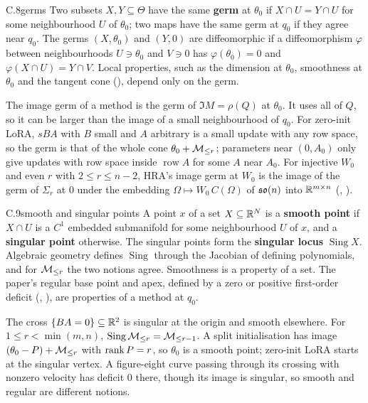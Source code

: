 \begin{bgentry}{C.8}{germs}
Two subsets $X,Y\subseteq\Theta$ have the same \textbf{germ} at $\theta_0$ if $X\cap U=Y\cap U$ for some neighbourhood
$U$ of $\theta_0$; two maps have the same germ at $q_0$ if they agree near $q_0$. The germs $(X,\theta_0)$ and $(Y,0)$
are diffeomorphic if a diffeomorphism $\varphi$ between neighbourhoods $U\ni\theta_0$ and $V\ni0$ has
$\varphi(\theta_0)=0$ and $\varphi(X\cap U)=Y\cap V$. Local properties, such as the dimension at $\theta_0$, smoothness
at $\theta_0$ and the tangent cone (), depend only on the germ.
\end{bgentry}

The image germ of a method is the germ of $\Im M=\rho(Q)$ at $\theta_0$. It uses all of $Q$, so it can be larger than
the image of a small neighbourhood of $q_0$. For zero-init LoRA, $sBA$ with $B$ small and $A$ arbitrary is a small
update with any row space, so the germ is that of the whole cone $\theta_0+\mathcal{M}_{\le r}$; parameters near $(0,A_0)$ only give
updates with row space inside $\operatorname{row}A$ for some $A$ near $A_0$. For injective $W_0$ and even $r$ with $2\le
r\le n-2$, HRA's image germ at $W_0$ is the image of the germ of $\Sigma_r$ at $0$ under the embedding $\Omega\mapsto
W_0\,C(\Omega)$ of $\mathfrak{so}(n)$ into $\mathbb{R}^{m\times n}$ (, ).


\begin{bgentry}{C.9}{smooth and singular points}
A point $x$ of a set $X\subseteq\mathbb{R}^N$ is a \textbf{smooth point} if $X\cap U$ is a $C^1$ embedded submanifold for some
neighbourhood $U$ of $x$, and a \textbf{singular point} otherwise. The singular points form the \textbf{singular locus}
$\operatorname{Sing}X$. Algebraic geometry defines $\operatorname{Sing}$ through the Jacobian of defining polynomials,
and for $\mathcal{M}_{\le r}$ the two notions agree. Smoothness is a property of a set. The paper's regular base point and apex, defined
by a zero or positive first-order deficit (, ), are properties of a method at $q_0$.
\end{bgentry}

The cross $\{BA=0\}\subseteq\mathbb{R}^2$ is singular at the origin and smooth elsewhere. For $1\le r<\min(m,n)$,
$\operatorname{Sing}\mathcal{M}_{\le r}=\mathcal{M}_{\le r-1}$. A split initialisation has image $(\theta_0-P)+\mathcal{M}_{\le r}$ with $\operatorname{rank} P=r$, so
$\theta_0$ is a smooth point; zero-init LoRA starts at the singular vertex. A figure-eight curve passing through its
crossing with nonzero velocity has deficit $0$ there, though its image is singular, so smooth and regular are different
notions.


